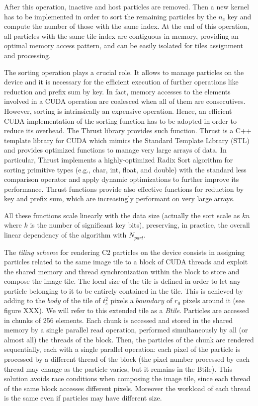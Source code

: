 \documentclass[11pt]{article}
\begin{document}
After this operation, inactive and host particles are removed. Then a new kernel has to be implemented in order to sort the remaining particles by the $n_c$ key and compute the number of those with the same index. 
At the end of this operation, all particles with the same tile index are contiguous in memory, providing an optimal memory access pattern, and can be easily isolated for tiles assignment and processing.

The sorting operation plays a crucial role. It allows to manage particles on the 
device and it is necessary for the efficient execution of further operations like 
reduction and prefix sum by key. In fact, memory accesses to the elements involved 
in a CUDA operation are coalesced when all of them are consecutives. However, sorting 
is intrinsically an expensive operation. Hence, an efficient CUDA implementation of
the sorting function has to be adopted in order to reduce its overhead. 
The Thrust library \cite{thrusturl} provides such function. Thrust is a C++ template library 
for CUDA which mimics the Standard Template Library (STL) and provides 
optimized functions to manage very large arrays of data. In particular, Thrust 
implements a highly-optimized Radix Sort algorithm for sorting primitive types
(e.g., char, int, float, and double) with the standard less comparison operator and 
apply dynamic optimizations to further improve its performance.
Thrust functions provide also effective functions for reduction by key and prefix sum, which are 
increasingly performant on very large arrays.

All these functions scale linearly with the data size (actually the sort scale 
as $kn$ where $k$ is the number of significant key bits),
preserving, in practice, the overall linear dependency of the algorithm with $N_{part}$.

The \textit{tiling scheme} for rendering C2 particles on the device consists in 
assigning particles related to the same image tile to a block of CUDA threads 
and exploit the shared memory and thread synchronization within the block to store 
and compose the image tile. The local size of the tile is defined in order to let any particle belonging to it to be entirely contained in the tile. This is achieved by 
adding to the $body$ of the tile of $t_s^2$ pixels a $boundary$ of $r_0$ pixels around it (see figure XXX). We will refer to this extended tile as a \textit{Btile}.
Particles are accessed in chunks of 256 elements. Each chunk is accessed and stored 
in the shared memory by a single parallel read operation, performed simultaneously by all (or almost all) the threads of the block. Then, the particles of the chunk are rendered sequentially, each with a single parallel operation: each pixel of the particle is processed by a different thread of the block (the pixel number processed by each thread may change as the particle varies, but it remains in the Btile). 
This solution avoids race conditions when composing the image tile, since each 
thread of the same block accesses different pixels. Moreover the workload of each thread is the same even if particles may have different size.
\end{document}
